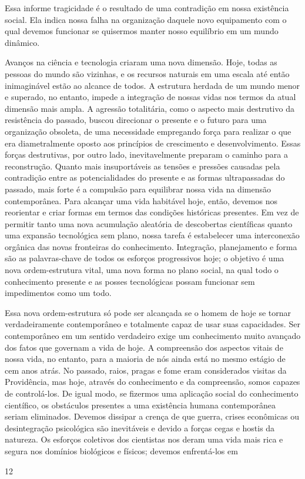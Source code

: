 \documentclass[a4paper]{article}
\begin{document}
Essa informe tragicidade é o resultado de uma contradição em nossa existência social. Ela indica nossa falha na organização daquele novo equipamento com o qual devemos funcionar se quisermos manter nosso equilíbrio em um mundo dinâmico.

Avanços na ciência e tecnologia criaram uma nova dimensão. Hoje, todas as pessoas do mundo são vizinhas, e os recursos naturais em uma escala até então inimaginável estão ao alcance de todos. A estrutura herdada de um mundo menor e superado, no entanto, impede a integração de nossas vidas nos termos da atual dimensão mais ampla. A agressão totalitária, como o aspecto mais destrutivo da resistência do passado, buscou direcionar o presente e o futuro para uma organização obsoleta, de uma necessidade empregando força para realizar o que era diametralmente oposto aos princípios de crescimento e desenvolvimento. Essas forças destrutivas, por outro lado, inevitavelmente preparam o caminho para a reconstrução. Quanto mais insuportáveis as tensões e pressões causadas pela contradição entre as potencialidades do presente e as formas ultrapassadas do passado, mais forte é a compulsão para equilibrar nossa vida na dimensão contemporânea. Para alcançar uma vida habitável hoje, então, devemos nos reorientar e criar formas em termos das condições históricas presentes. Em vez de permitir tanto uma nova acumulação aleatória de descobertas científicas quanto uma expansão tecnológica sem plano, nossa tarefa é estabelecer uma interconexão orgânica das novas fronteiras do conhecimento. Integração, planejamento e forma são as palavras-chave de todos os esforços progressivos hoje; o objetivo é uma nova ordem-estrutura vital, uma nova forma no plano social, na qual todo o conhecimento presente e as posses tecnológicas possam funcionar sem impedimentos como um todo.

Essa nova ordem-estrutura só pode ser alcançada se o homem de hoje se tornar verdadeiramente contemporâneo e totalmente capaz de usar suas capacidades. Ser contemporâneo em um sentido verdadeiro exige um conhecimento muito avançado dos fatos que governam a vida de hoje. A compreensão dos aspectos vitais de nossa vida, no entanto, para a maioria de nós ainda está no mesmo estágio de cem anos atrás. No passado, raios, pragas e fome eram considerados visitas da Providência, mas hoje, através do conhecimento e da compreensão, somos capazes de controlá-los. De igual modo, se fizermos uma aplicação social do conhecimento científico, os obstáculos presentes a uma existência humana contemporânea seriam eliminados. Devemos dissipar a crença de que guerra, crises econômicas ou desintegração psicológica são inevitáveis e devido a forças cegas e hostis da natureza. Os esforços coletivos dos cientistas nos deram uma vida mais rica e segura nos domínios biológicos e físicos; devemos enfrentá-los em
\vfill
\begin{center}
12
\end{center}
\end{document}
